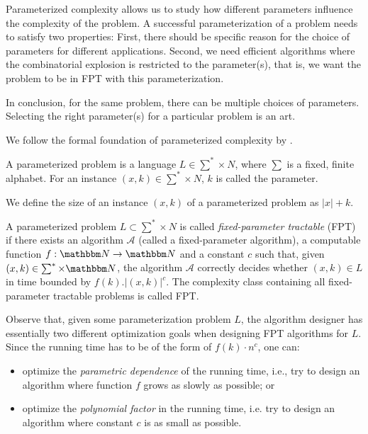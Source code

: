 Parameterized complexity allows us to study how different parameters influence the complexity of the problem.
A successful parameterization of a problem needs to satisfy two properties:
First, there should be specific reason for the choice of parameters for different applications.
Second, we need efficient algorithms where the combinatorial explosion is restricted to the parameter(s), that is, we want the problem to be in FPT with this parameterization.

In conclusion, for the same problem, there can be multiple choices of parameters. 
Selecting the right parameter(s) for a particular problem is an art.

We follow the formal foundation of parameterized complexity by \cite{cygan2015parameterized}.

\begin{definition}
 A parameterized problem is a language $L \in \sum^* \times N$, where $\sum$ is a fixed, finite alphabet. For an instance $(x,k) \in \sum^* \times N$, $k$ is called the parameter.
\end{definition}

We define the size of an instance $(x,k)$ of a parameterized problem as $|x| + k$. 

\begin{definition}
 A parameterized problem $L \subset \sum^* \times N$ is called \textit{fixed-parameter tractable} (FPT) if there exists an algorithm $\mathcal{A}$ (called a fixed-parameter algorithm),
 a computable function $f: \N \rightarrow \N$ and a constant $c$ such that, given $(x,k) \in \sum^* \times \N$, the algorithm $\mathcal{A}$ correctly decides
 whether $(x,k) \in L$ in time bounded by $f(k). |(x,k)|^c$.
 The complexity class containing all fixed-parameter tractable problems is called FPT.
\end{definition}

Observe that, given some parameterization problem $L$, the algorithm designer has essentially two different optimization goals when designing FPT algorithms for $L$.
Since the running time has to be of the form of $f(k)\cdot n^c$, one can:
\begin{itemize}
 \item optimize the \textit{parametric dependence} of the running time, i.e., try to design an algorithm where function $f$ grows as slowly as possible; or
 \item optimize the \textit{polynomial factor} in the running time, i.e. try to design an algorithm where constant $c$ is as small as possible.
\end{itemize}

